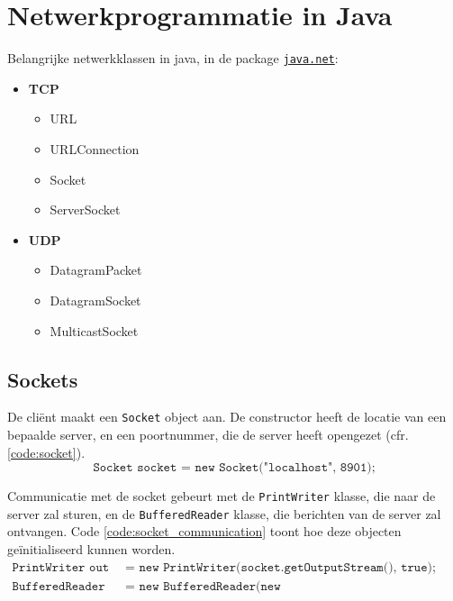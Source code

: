 \documentclass{report}
\begin{document}
\chapter{Netwerkprogrammatie in Java}
Belangrijke netwerkklassen in java, in de package \underline{\texttt{java.net}}:
\begin{itemize}
    \item \textbf{TCP} 
        \begin{itemize}
            \item URL
            \item URLConnection
            \item Socket
            \item ServerSocket
        \end{itemize}
    \item \textbf{UDP}
        \begin{itemize}
            \item DatagramPacket
            \item DatagramSocket
            \item MulticastSocket
        \end{itemize}
\end{itemize}
\section{Sockets}
De cliënt maakt een \texttt{Socket} object aan. De constructor heeft de locatie van een bepaalde server, en een poortnummer, die de server heeft opengezet (cfr. \ref{code:socket}).
\begin{equation}
	\texttt{Socket socket = new Socket("localhost", 8901);}
	\label{code:socket}
\end{equation}

 Communicatie met de socket gebeurt met de \texttt{PrintWriter} klasse, die naar de server zal sturen, en de \texttt{BufferedReader} klasse, die berichten van de server zal ontvangen. Code \ref{code:socket_communication} toont hoe deze objecten geïnitialiseerd kunnen worden.
 \begin{equation}
	\begin{split}
		\texttt{PrintWriter out} & \texttt{ = new PrintWriter(socket.getOutputStream(), true);} \\
		\texttt{BufferedReader in} & \texttt{ = new BufferedReader(new InputStreamReader(socket.getInputStream()));}
	\end{split}
	\label{code:socket_communication}
 \end{equation}
\end{document}

